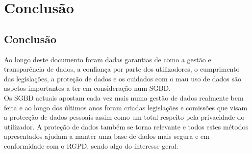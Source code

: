 \chapter{Conclusão}
\label{conc:conclusao_e_trabalho_futuro}

\section{Conclusão}
\label{conc:conclusao}
 
Ao longo deste documento foram dadas garantias de como a gestão e transparência de dados, a confiança por parte dos utilizadores, o cumprimento das legislações, a proteção de dados e os cuidados com o mau uso de dados são aspetos importantes a ter em consideração num \ac{SGBD}. \\
Os SGBD actuais apostam cada vez mais numa gestão de dados realmente bem feita e ao longo dos últimos anos foram criadas legislações e comissões que visam a protecção de dados pessoais assim como um total respeito pela privacidade do utilizador.
A proteção de dados também se torna relevante e todos estes métodos apresentados ajudam a manter uma base de dados mais segura e em conformidade com o \ac{RGPD}, sendo algo do interesse geral.


